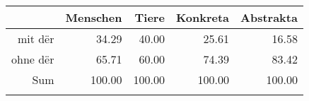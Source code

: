 \begin{tabular}{rrrrr}
  \lsptoprule
 & Menschen & Tiere & Konkreta & Abstrakta \\ 
  \midrule
mit dër & 34.29 & 40.00 & 25.61 & 16.58 \\ 
  ohne dër & 65.71 & 60.00 & 74.39 & 83.42 \\ 
  Sum & 100.00 & 100.00 & 100.00 & 100.00 \\ 
   \lspbottomrule
\end{tabular}
